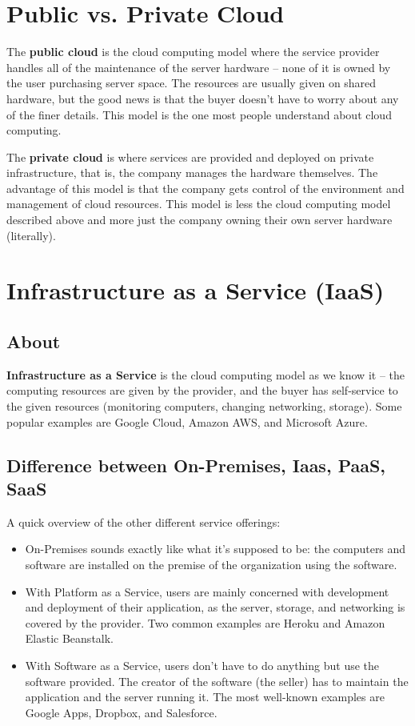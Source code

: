 \documentclass{report}
\newcommand{\npar}{\par\noindent}
\newcommand{\vpar}{\vspace{1em}\npar}
\begin{document}
\section{Public vs. Private Cloud}

\par The \textbf{public cloud} is the cloud computing model where the service provider handles all of the maintenance of the server hardware -- none of it is owned by the user purchasing server space. The resources are usually given on shared hardware, but the good news is that the buyer doesn't have to worry about any of the finer details. This model is the one most people understand about cloud computing.

\vpar The \textbf{private cloud} is where services are provided and deployed on private infrastructure, that is, the company manages the hardware themselves. The advantage of this model is that the company gets control of the environment and management of cloud resources. This model is less the cloud computing model described above and more just the company owning their own server hardware (literally).

\newpage
\section{Infrastructure as a Service (IaaS)}

\subsection{About}

\par \textbf{Infrastructure as a Service} is the cloud computing model as we know it -- the computing resources are given by the provider, and the buyer has self-service to the given resources (monitoring computers, changing networking, storage). Some popular examples are Google Cloud, Amazon AWS, and Microsoft Azure.

\subsection{Difference between On-Premises, Iaas, PaaS, SaaS}

\par A quick overview of the other different service offerings:
\begin{itemize}
    \item On-Premises sounds exactly like what it's supposed to be: the computers and software are installed on the premise of the organization using the software.
    \item With Platform as a Service, users are mainly concerned with development and deployment of their application, as the server, storage, and networking is covered by the provider. Two common examples are Heroku and Amazon Elastic Beanstalk.
    \item With Software as a Service, users don't have to do anything but use the software provided. The creator of the software (the seller) has to maintain the application and the server running it. The most well-known examples are Google Apps, Dropbox, and Salesforce.
\end{itemize}
\end{document}
